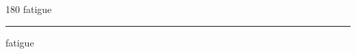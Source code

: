 
\begin{frame}
\begin{center}
\begin{turn}{180}
{\fontsize{2.5cm}{1em}\selectfont fatigue}
\end{turn}
\vspace{1em}\par  
\hrule
\vspace{1em}\par  
{\fontsize{2.5cm}{1em}\selectfont fatigue}
\end{center}
\end{frame}
